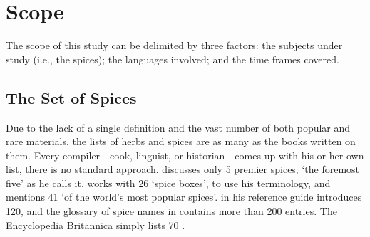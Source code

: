 


\section{Scope}

The scope of this study can be delimited by three factors: the subjects under study (i.e., the spices); the languages involved; and the time frames covered.

\subsection{The Set of Spices}

Due to the lack of a single definition and the vast number of both popular and rare materials, the lists of herbs and spices are as many as the books written on them. Every compiler---cook, linguist, or historian---comes up with his or her own list, there is no standard approach. \textcite{czarra_spices_2009} discusses only 5 premier spices, `the foremost five' as he calls it, \textcite{nabhan_cumin_2014} works with 26 `spice boxes', to use his terminology, and \textcite{rosengarten_book_1973} mentions 41 `of the world's most popular spices'. \textcite{van_wyk_culinary_2014} in his reference guide introduces 120, and the glossary of spice names in \textcite{dalby_dangerous_2000} contains more than 200 entries. The Encyclopedia Britannica simply lists 70 \autocite{petruzzello_list_2021}. 

